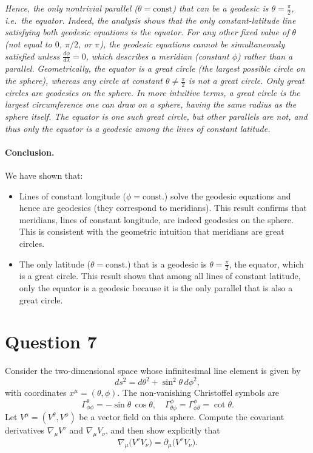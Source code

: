 \documentclass{article}
\begin{document}
\emph{Hence, the only nontrivial parallel (\(\theta = \text{const}\)) that can be a geodesic is \(\theta = \tfrac{\pi}{2}\), i.e.\ the equator. Indeed, the analysis shows that the only constant-latitude line satisfying both geodesic equations is the equator. For any other fixed value of \(\theta\) (not equal to \(0\), \(\pi/2\), or \(\pi\)), the geodesic equations cannot be simultaneously satisfied unless \(\tfrac{d\phi}{d\lambda} = 0\), which describes a meridian (constant \(\phi\)) rather than a parallel.}
\emph{
Geometrically, the equator is a great circle (the largest possible circle on the sphere), whereas any circle at constant \(\theta \neq \tfrac{\pi}{2}\) is not a great circle. Only great circles are geodesics on the sphere. In more intuitive terms, a great circle is the largest circumference one can draw on a sphere, having the same radius as the sphere itself. The equator is one such great circle, but other parallels are not, and thus only the equator is a geodesic among the lines of constant latitude.}

\paragraph{Conclusion.}
We have shown that:
\begin{itemize}
\item Lines of constant longitude (\(\phi=\text{const.}\)) solve the geodesic equations and hence are geodesics (they correspond to meridians). This result confirms that meridians, lines of constant longitude, are indeed geodesics on the sphere. This is consistent with the geometric intuition that meridians are great circles.

\item The only latitude (\(\theta=\text{const.}\)) that is a geodesic is \(\theta=\tfrac{\pi}{2}\), the equator, which is a great circle. This result shows that among all lines of constant latitude, only the equator is a geodesic because it is the only parallel that is also a great circle.
\end{itemize}

\pagebreak

\section*{Question 7}

Consider the two-dimensional space whose infinitesimal line element is given by
\[
ds^2 = d\theta^2 + \sin^2\theta \, d\phi^2,
\]
with coordinates \(x^\mu = (\theta, \phi)\). The non-vanishing Christoffel symbols are
\[
\Gamma^\theta_{\phi\phi} = -\sin\theta\,\cos\theta,
\quad
\Gamma^\phi_{\theta\phi} = \Gamma^\phi_{\phi\theta} = \cot\theta.
\]
Let \(V^\mu = (V^\theta, V^\phi)\) be a vector field on this sphere. Compute the covariant derivatives \(\nabla_\mu V^\nu\) and \(\nabla_\mu V_\nu\), and then show explicitly that
\[
\nabla_{\mu} \bigl( V^{\nu} V_{\nu} \bigr)
=
\partial_{\mu} \bigl( V^{\nu} V_{\nu} \bigr).
\]
\end{document}
